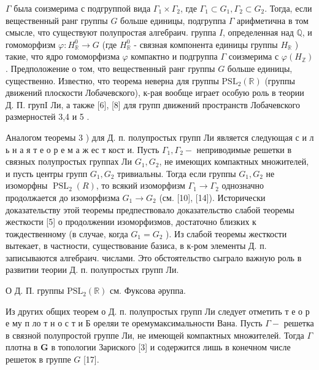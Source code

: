 \documentclass[10pt]{article}
\begin{document}
$\Gamma$ была соизмерима с подгруппой вида $\Gamma_{1} \times \Gamma_{2}$, где $\Gamma_{1} \subset G_{1}, \Gamma_{2} \subset G_{2}$. Тогда, если вещественный ранг группы $G$ больше единицы, подгруппа $\Gamma$ арифметична в том смысле, что существуют полупростая алгебраич. группа $I$, определенная над $\mathbb{Q}$, и гомоморфизм $\varphi: H_{\mathbb{R}}^{0} \rightarrow G$ (где $H_{\mathbb{R}}^{0}$ - связная компонента единицы группы $H_{\mathbb{R}}$ ) такие, что ядро гомоморфизма $\varphi$ компактно и подгруппа $\Gamma$ соизмерима с $\varphi\left(H_{\mathbb{Z}}\right)$. Предположение о том, что вещественный ранг группы $G$ больше единицы, существенно. Известно, что теорема неверна для группы $\mathrm{PSL}_{2}(\mathbb{R})$ (группы движений плоскости Лобачевского), к-рая вообще играет особую роль в теории Д. П. групI Ли, а также [6], [8] для групп движений пространств Лобачевского размерностей 3,4 и 5 .



Аналогом теоремы 3 ) для Д. п. полупростых групп Ли является следующая с и л ь н а я т е о р е м а ж ес т кост и. Пусть $\Gamma_{1}, \Gamma_{2}-$ неприводимые решетки в связных полупростых группах Ли $G_{1}, G_{2}$, не имеющих компактных множителей, и пусть центры групп $G_{1}, G_{2}$ тривиальны. Тогда если группы $G_{1}, G_{2}$ не изоморфны $\operatorname{PSL}_{2}(R)$, то всякий изоморфизм $\Gamma_{1} \rightarrow \Gamma_{2}$ однозначно продолжается до изоморфизма $G_{1} \rightarrow G_{2}$ (см. [10], [14]). Исторически доказательству этой теоремы предпествовало доказательство слабой теоремы жесткости [5] о продолжении изоморфизмов, достаточно близких к тождественному (в случае, когда $G_{1}=G_{2}$ ). Из слабой теоремы жесткости вытекает, в частности, существование базиса, в к-ром элементы Д. п. записываются алгебраич. числами. Это обстоятельство сыграло важную роль в развитии теории Д. п. полупростых групп Ли.



О Д. П. группы $\mathrm{PSL}_{2}(\mathbb{R})$ см. Фуксова әруппа.



Из других общих теорем о Д. п. полупростых групп Ли следует отметить т е о р е му п ло т н о с т и Б ореляи те оремумаксимальности Вана. Пусть $\Gamma-$ решетка в связной полупростой группе Ли, не имеющей компактных множителей. Тогда $\Gamma$ плотна в $\boldsymbol{G}$ в топологии Зариского [3] и содержится лишь в конечном числе решеток в группе $G$ [17].
\end{document}
